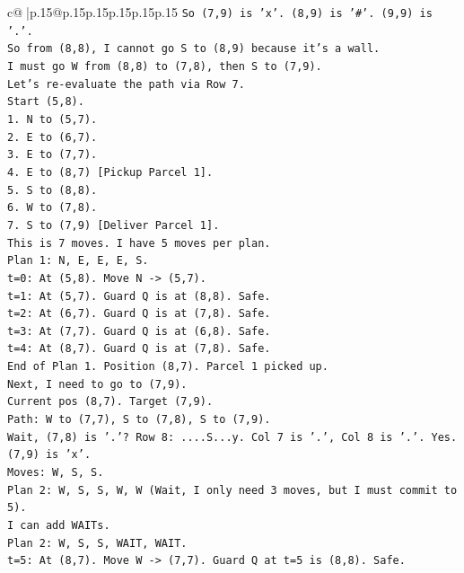 \documentclass{article}
\begin{document}
{\begin{supertabular}{c@{$\;$}|p{.15\linewidth}@{}p{.15\linewidth}p{.15\linewidth}p{.15\linewidth}p{.15\linewidth}p{.15\linewidth}}
{{{\texttt{So (7,9) is 'x'. (8,9) is '\#'. (9,9) is '.'.} \\
\texttt{So from (8,8), I cannot go S to (8,9) because it's a wall.} \\
\texttt{I must go W from (8,8) to (7,8), then S to (7,9).} \\
\texttt{Let's re{-}evaluate the path via Row 7.} \\
\texttt{Start (5,8).} \\
\texttt{1. N to (5,7).} \\
\texttt{2. E to (6,7).} \\
\texttt{3. E to (7,7).} \\
\texttt{4. E to (8,7) {[}Pickup Parcel 1{]}.} \\
\texttt{5. S to (8,8).} \\
\texttt{6. W to (7,8).} \\
\texttt{7. S to (7,9) {[}Deliver Parcel 1{]}.} \\
\texttt{This is 7 moves. I have 5 moves per plan.} \\
\texttt{Plan 1: N, E, E, E, S.} \\
\texttt{t=0: At (5,8). Move N {-}> (5,7).} \\
\texttt{t=1: At (5,7). Guard Q is at (8,8). Safe.} \\
\texttt{t=2: At (6,7). Guard Q is at (7,8). Safe.} \\
\texttt{t=3: At (7,7). Guard Q is at (6,8). Safe.} \\
\texttt{t=4: At (8,7). Guard Q is at (7,8). Safe.} \\
\texttt{End of Plan 1. Position (8,7). Parcel 1 picked up.} \\
\texttt{Next, I need to go to (7,9).} \\
\texttt{Current pos (8,7). Target (7,9).} \\
\texttt{Path: W to (7,7), S to (7,8), S to (7,9).} \\
\texttt{Wait, (7,8) is '.'? Row 8: ....S...y. Col 7 is '.', Col 8 is '.'. Yes.} \\
\texttt{(7,9) is 'x'.} \\
\texttt{Moves: W, S, S.} \\
\texttt{Plan 2: W, S, S, W, W (Wait, I only need 3 moves, but I must commit to 5).} \\
\texttt{I can add WAITs.} \\
\texttt{Plan 2: W, S, S, WAIT, WAIT.} \\
\texttt{t=5: At (8,7). Move W {-}> (7,7). Guard Q at t=5 is (8,8). Safe.} \\
}}}
\end{supertabular}}
\end{document}
